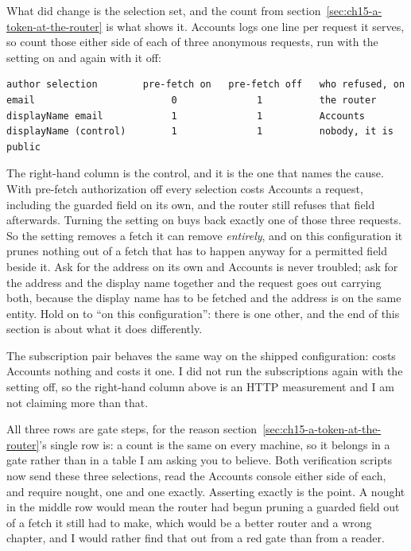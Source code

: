 %
%
What did change is the selection set, and the count from
section~\ref{sec:ch15-a-token-at-the-router} is what shows it. Accounts logs one
 line per request it serves, so count those either
side of each of three anonymous requests, run with the setting on and again with
it off:

\begin{verbatim}
author selection        pre-fetch on   pre-fetch off   who refused, on
email                        0              1          the router
displayName email            1              1          Accounts
displayName (control)        1              1          nobody, it is public
\end{verbatim}

The right-hand column is the control, and it is the one that names the cause.
With pre-fetch authorization off every selection costs Accounts a request,
including the guarded field on its own, and the router still refuses that field
afterwards. Turning the setting on buys back exactly one of those three
requests. So the setting removes a fetch it can remove \emph{entirely}, and on
this configuration it prunes nothing out of a fetch that has to happen anyway
for a permitted field beside it. Ask for the address on its own and Accounts is
never troubled; ask for the address and the display name together and the
request goes out carrying both, because the display name has to be fetched and
the address is on the same entity. Hold on to \enquote{on this configuration}:
there is one other, and the end of this section is about what it does
differently.

The subscription pair behaves the same way on the shipped configuration:
 costs Accounts nothing and
 costs it one. I did not run the
subscriptions again with the setting off, so the right-hand column above is an
HTTP measurement and I am not claiming more than that.

%
All three rows are gate steps, for the reason
section~\ref{sec:ch15-a-token-at-the-router}'s single row is: a count is the
same on every machine, so it belongs in a gate rather than in a table I am
asking you to believe. Both verification scripts now send these three
selections, read the Accounts console either side of each, and require nought,
one and one exactly. Asserting exactly is the point. A nought in the middle row
would mean the router had begun pruning a guarded field out of a fetch it still
had to make, which would be a better router and a wrong chapter, and I would
rather find that out from a red gate than from a reader.

